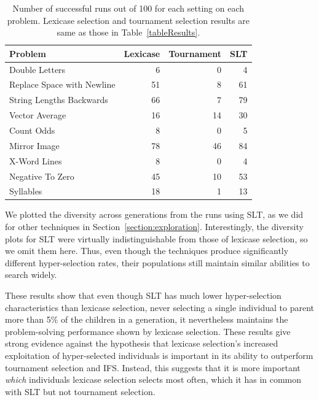 \documentclass{sig-alternate-05-2015}
\begin{document}
\begin{table}[t]
\centering
\caption{Number of successful runs out of 100 for each setting on each problem. Lexicase selection and tournament selection results are same as those in Table~\ref{tableResults}.}
\label{table:slt-results}
\begin{tabular}{lrrr}
\toprule
\textbf{Problem}                    & \textbf{Lexicase} & \textbf{Tournament} & \textbf{SLT} \\
\midrule
Double Letters             & 6        & 0          & 4   \\
Replace Space with Newline & 51       & 8          & 61  \\
String Lengths Backwards   & 66       & 7          & 79  \\
Vector Average             & 16       & 14         & 30  \\
Count Odds                 & 8        & 0          & 5   \\
Mirror Image               & 78       & 46         & 84  \\
X-Word Lines               & 8        & 0          & 4   \\
Negative To Zero           & 45       & 10         & 53  \\
Syllables                  & 18       & 1          & 13  \\
\bottomrule
\end{tabular}
\end{table}

We plotted the diversity across generations from the runs using SLT, as we did for other techniques in Section~\ref{section:exploration}. Interestingly, the diversity plots for SLT were virtually indistinguishable from those of lexicase selection, so we omit them here. Thus, even though the techniques produce significantly different hyper-selection rates, their populations still maintain similar abilities to search widely.

These results show that even though SLT has much lower hyper-selection characteristics than lexicase selection, never selecting a single individual to parent more than 5\% of the children in a generation, it nevertheless maintains the problem-solving performance shown by lexicase selection. These results give strong evidence against the hypothesis that lexicase selection's increased exploitation of hyper-selected individuals is important in its ability to outperform tournament selection and IFS. Instead, this suggests that it is more important \textit{which} individuals lexicase selection selects most often, which it has in common with SLT but not tournament selection.
\end{document}
